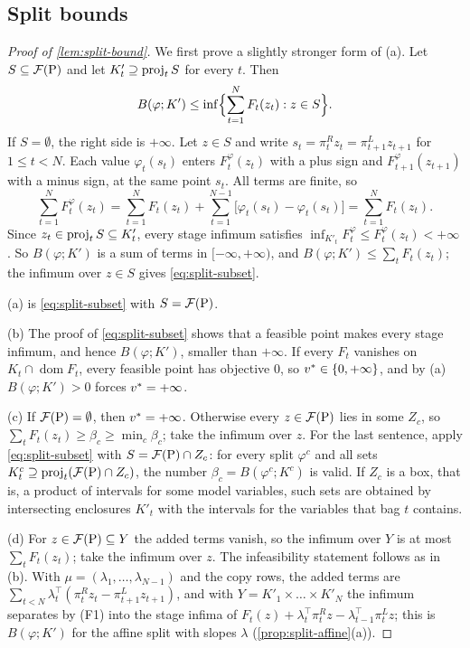 \subsection{Split bounds}\label{app:splitproofs-bound}

\begin{proof}[Proof of \cref{lem:split-bound}]
We first prove a slightly stronger form of (a).
Let $S\subseteq\feas[\mathrm P]$ and let $K'_t\supseteq\proj_tS$ for every
$t$.
Then
\begin{equation}\label{eq:split-subset}
  B(\varphi;K')\le\inf\Bigl\{\sum_{t=1}^NF_t(z_t):z\in S\Bigr\}.
\end{equation}
If $S=\emptyset$, the right side is $+\infty$.
Let $z\in S$ and write $s_t=\pi^R_tz_t=\pi^L_{t+1}z_{t+1}$ for $1\le t<N$.
Each value $\varphi_t(s_t)$ enters $F^\varphi_t(z_t)$ with a plus sign and
$F^\varphi_{t+1}(z_{t+1})$ with a minus sign, at the same point $s_t$.
All terms are finite, so
\begin{equation}\label{eq:split-telescope}
  \sum_{t=1}^N F^\varphi_t(z_t)
  =\sum_{t=1}^N F_t(z_t)+\sum_{t=1}^{N-1}\bigl[\varphi_t(s_t)-\varphi_t(s_t)\bigr]
  =\sum_{t=1}^N F_t(z_t).
\end{equation}
Since $z_t\in\proj_tS\subseteq K'_t$, every stage infimum satisfies
$\inf_{K'_t}F^\varphi_t\le F^\varphi_t(z_t)<+\infty$.
So $B(\varphi;K')$ is a sum of terms in $[-\infty,+\infty)$, and
$B(\varphi;K')\le\sum_tF_t(z_t)$; the infimum over $z\in S$ gives
\eqref{eq:split-subset}.

(a) is \eqref{eq:split-subset} with $S=\feas[\mathrm P]$.

(b) The proof of \eqref{eq:split-subset} shows that a feasible point makes
every stage infimum, and hence $B(\varphi;K')$, smaller than $+\infty$.
If every $F_t$ vanishes on $K_t\cap\operatorname{dom}F_t$, every feasible
point has objective $0$, so $\vstar\in\{0,+\infty\}$, and by (a)
$B(\varphi;K')>0$ forces $\vstar=+\infty$.

(c) If $\feas[\mathrm P]=\emptyset$, then $\vstar=+\infty$.
Otherwise every $z\in\feas[\mathrm P]$ lies in some $Z_c$, so
$\sum_tF_t(z_t)\ge\beta_c\ge\min_c\beta_c$; take the infimum over $z$.
For the last sentence, apply \eqref{eq:split-subset} with
$S=\feas[\mathrm P]\cap Z_c$: for every split $\varphi^c$ and all sets
$K^c_t\supseteq\proj_t(\feas[\mathrm P]\cap Z_c)$, the number
$\beta_c=B(\varphi^c;K^c)$ is valid.
If $Z_c$ is a box, that is, a product of intervals for some model variables,
such sets are obtained by intersecting enclosures $K'_t$ with the intervals for
the variables that bag $t$ contains.

(d) For $z\in\feas[\mathrm P]\subseteq Y$ the added terms vanish, so the
infimum over $Y$ is at most $\sum_tF_t(z_t)$; take the infimum over $z$.
The infeasibility statement follows as in (b).
With $\mu=(\lambda_1,\dots,\lambda_{N-1})$ and the copy rows, the added terms
are $\sum_{t<N}\lambda_t^\top(\pi^R_tz_t-\pi^L_{t+1}z_{t+1})$, and with
$Y=K'_1\times\dots\times K'_N$ the infimum separates by (F1) into the stage
infima of $F_t(z)+\lambda_t^\top\pi^R_tz-\lambda_{t-1}^\top\pi^L_tz$; this is
$B(\varphi;K')$ for the affine split with slopes $\lambda$
(\cref{prop:split-affine}(a)).
\end{proof}

